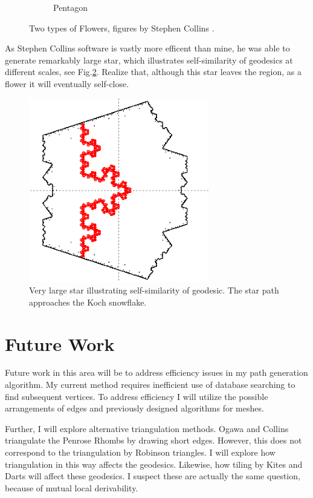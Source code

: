 \documentclass[
  oneside,
  11pt, a4paper,
  footinclude=true,
  headinclude=true,
  cleardoublepage=empty
]{scrbook}
\begin{document}
\begin{figure}[H]
\begin{subfigure}[b]{0.45\textwidth}
\caption[Pentagon]{Pentagon}
\end{subfigure}
\caption[Rings]{Two types of Flowers, figures by Stephen Collins \cite{Collins}.}
\label{fig:collinsflowers}
\end{figure}
As Stephen Collins software is vastly more efficent than mine, he was able to generate remarkably large star, which illustrates self-similarity of geodesics at different scales, see Fig.\ref{fig:Koch}. Realize that, although this star leaves the region, as a flower it will eventually self-close. 
\begin{figure}[H]
\centering
\includegraphics[width=0.7\textwidth]{Koch}
\caption[Koch]{Very large star illustrating self-similarity of geodesic. The star path approaches the Koch snowflake. \cite{Collins}}
\label{fig:Koch}
\end{figure}

\section{Future Work}
Future work in this area will be to address efficiency issues in my path generation algorithm. My current method requires inefficient use of database searching to find subsequent vertices. To address efficiency I will utilize the possible arrangements of edges and previously designed algorithms for meshes. 

Further, I will explore alternative triangulation methods. Ogawa and Collins triangulate the Penrose Rhombs by drawing short edges. However, this does not correspond to the triangulation by Robinson triangles. I will explore how triangulation in this way affects the geodesics. Likewise, how tiling by Kites and Darts will affect these geodesics. I suspect these are actually the same question, because of mutual local derivability.
\end{document}
